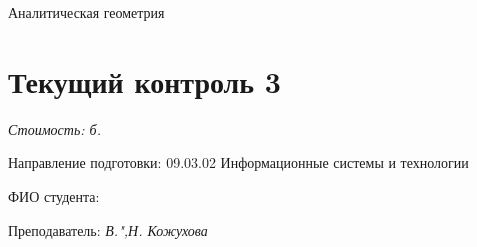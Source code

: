 \documentclass[a4paper, 12pt]{article}
\begin{document}
\thispagestyle{empty}

\vspace{-10ex}
	
\begin{center}
\Huge{Аналитическая геометрия}\\
\vspace{-3ex}
\section*{Текущий контроль 3}
\end{center}
\vspace{-2ex}	
\textit{Стоимость: \pointssum* б.}
\begin{flushleft}
Направление подготовки: 09.03.02 Информационные системы и технологии %

ФИО студента: %
 

Преподаватель: \textit{В.",Н. Кожухова}	
\end{flushleft}	
\end{document}
